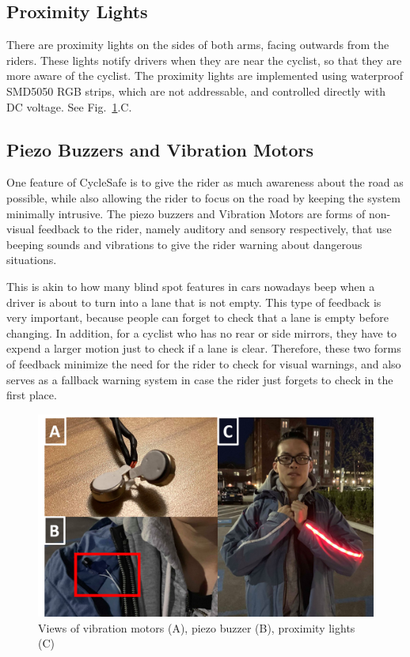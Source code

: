 \documentclass[journal]{IEEEtran}
\begin{document}
\subsection{Proximity Lights}
There are proximity lights on the sides of both arms, facing outwards from the riders. These lights notify drivers when they are near the cyclist, so that they are more aware of the cyclist. The proximity lights are implemented using waterproof SMD5050 RGB strips, which are not addressable, and controlled directly with DC voltage. See Fig.~\ref{fig:buzz_motor_prox}.C.

\subsection{Piezo Buzzers and Vibration Motors}
One feature of CycleSafe is to give the rider as much awareness about the road as possible, while also allowing the rider to focus on the road by keeping the system minimally intrusive. The piezo buzzers and Vibration Motors are forms of non-visual feedback to the rider, namely auditory and sensory respectively, that use beeping sounds and vibrations to give the rider warning about dangerous situations.

This is akin to how many blind spot features in cars nowadays beep when a driver is about to turn into a lane that is not empty. This type of feedback is very important, because people can forget to check that a lane is empty before changing. In addition, for a cyclist who has no rear or side mirrors, they have to expend a larger motion just to check if a lane is clear. Therefore, these two forms of feedback minimize the need for the rider to check for visual warnings, and also serves as a fallback warning system in case the rider just forgets to check in the first place.

\begin{figure}
    \centering
    \includegraphics[width=\columnwidth]{images/buzzer_motor_prox.png}
    \caption{Views of vibration motors (A), piezo buzzer (B), proximity lights (C)}
    \label{fig:buzz_motor_prox}
\end{figure}
\end{document}
